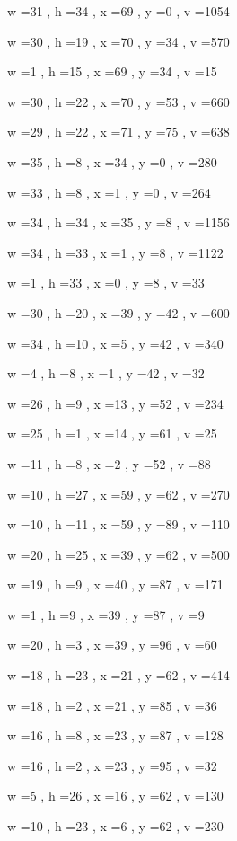 \documentclass[11pt]{article}
\begin{document}
w =31 , h =34 , x =69 , y =0 , v =1054
\par
w =30 , h =19 , x =70 , y =34 , v =570
\par
w =1 , h =15 , x =69 , y =34 , v =15
\par
w =30 , h =22 , x =70 , y =53 , v =660
\par
w =29 , h =22 , x =71 , y =75 , v =638
\par
w =35 , h =8 , x =34 , y =0 , v =280
\par
w =33 , h =8 , x =1 , y =0 , v =264
\par
w =34 , h =34 , x =35 , y =8 , v =1156
\par
w =34 , h =33 , x =1 , y =8 , v =1122
\par
w =1 , h =33 , x =0 , y =8 , v =33
\par
w =30 , h =20 , x =39 , y =42 , v =600
\par
w =34 , h =10 , x =5 , y =42 , v =340
\par
w =4 , h =8 , x =1 , y =42 , v =32
\par
w =26 , h =9 , x =13 , y =52 , v =234
\par
w =25 , h =1 , x =14 , y =61 , v =25
\par
w =11 , h =8 , x =2 , y =52 , v =88
\par
w =10 , h =27 , x =59 , y =62 , v =270
\par
w =10 , h =11 , x =59 , y =89 , v =110
\par
w =20 , h =25 , x =39 , y =62 , v =500
\par
w =19 , h =9 , x =40 , y =87 , v =171
\par
w =1 , h =9 , x =39 , y =87 , v =9
\par
w =20 , h =3 , x =39 , y =96 , v =60
\par
w =18 , h =23 , x =21 , y =62 , v =414
\par
w =18 , h =2 , x =21 , y =85 , v =36
\par
w =16 , h =8 , x =23 , y =87 , v =128
\par
w =16 , h =2 , x =23 , y =95 , v =32
\par
w =5 , h =26 , x =16 , y =62 , v =130
\par
w =10 , h =23 , x =6 , y =62 , v =230
\par
\newpage
\end{document}

